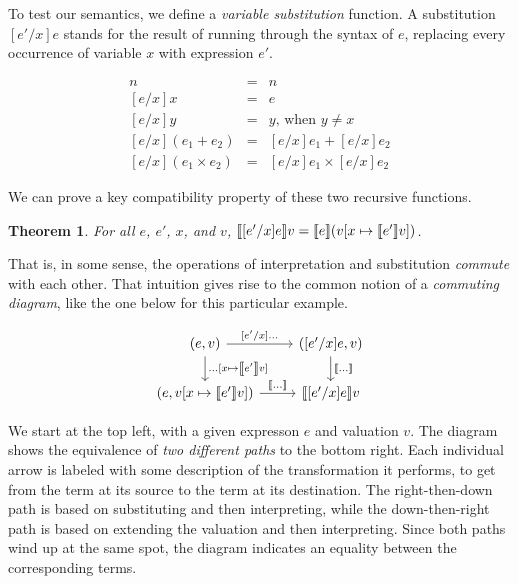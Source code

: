 \documentclass{amsbook}
\newtheorem{theorem}{Theorem}[chapter]
\theoremstyle{definition}
\theoremstyle{remark}
\numberwithin{section}{chapter}
\numberwithin{equation}{chapter}
\begin{document}
\newcommand{\subst}[3]{[#3/#2]#1}

To test our semantics, we define a \emph{variable substitution} function.
A substitution $\subst{e}{x}{e'}$ stands for the result of running through the syntax of $e$,
replacing every occurrence of variable $x$ with expression $e'$.

\begin{eqnarray*}
  \subst{n}{x}{e} &=& n \\
  \subst{x}{x}{e} &=& e \\
  \subst{y}{x}{e} &=& y \textrm{, when $y \neq x$} \\
  \subst{(e_1 + e_2)}{x}{e} &=& \subst{e_1}{x}{e} + \subst{e_2}{x}{e} \\
  \subst{(e_1 \times e_2)}{x}{e} &=& \subst{e_1}{x}{e} \times \subst{e_2}{x}{e}
\end{eqnarray*}

We can prove a key compatibility property of these two recursive functions.

\begin{theorem}
  For all $e$, $e'$, $x$, and $v$, $\denote{\subst{e}{x}{e'}}{v} = \denote{e}{(\mupd{v}{x}{\denote{e'}{v}})}$.
\end{theorem}

That is, in some sense, the operations of interpretation and substitution \emph{commute} with each other.
That intuition gives rise to the common notion of a \emph{commuting diagram}, like the one below for this particular example.

\[
\begin{tikzcd}
(e, v) \arrow{r}{\subst{\ldots}{x}{e'}} \arrow{d}{\mupd{\ldots}{x}{\denote{e'}v}} & (\subst{e}{x}{e'}, v) \arrow{d}{\denote{\ldots}} \\
(e, \mupd{v}{x}{\denote{e'}v}) \arrow{r}{\denote{\ldots}} & \denote{\subst{e}{x}{e'}}v
\end{tikzcd}
\]

We start at the top left, with a given expresson $e$ and valuation $v$.
The diagram shows the equivalence of \emph{two different paths} to the bottom right.
Each individual arrow is labeled with some description of the transformation it performs, to get from the term at its source to the term at its destination.
The right-then-down path is based on substituting and then interpreting, while the down-then-right path is based on extending the valuation and then interpreting.
Since both paths wind up at the same spot, the diagram indicates an equality between the corresponding terms.
\end{document}
